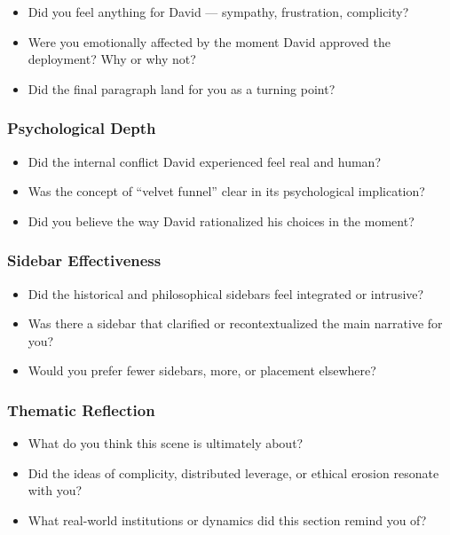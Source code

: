 \begin{itemize}
  \item Did you feel anything for David — sympathy, frustration, complicity?
  \item Were you emotionally affected by the moment David approved the deployment? Why or why not?
  \item Did the final paragraph land for you as a turning point?
\end{itemize}

\subsubsection{Psychological Depth}

\begin{itemize}
  \item Did the internal conflict David experienced feel real and human?
  \item Was the concept of “velvet funnel” clear in its psychological implication?
  \item Did you believe the way David rationalized his choices in the moment?
\end{itemize}

\subsubsection{Sidebar Effectiveness}

\begin{itemize}
  \item Did the historical and philosophical sidebars feel integrated or intrusive?
  \item Was there a sidebar that clarified or recontextualized the main narrative for you?
  \item Would you prefer fewer sidebars, more, or placement elsewhere?
\end{itemize}

\subsubsection{Thematic Reflection}

\begin{itemize}
  \item What do you think this scene is ultimately about?
  \item Did the ideas of complicity, distributed leverage, or ethical erosion resonate with you?
  \item What real-world institutions or dynamics did this section remind you of?
\end{itemize}

